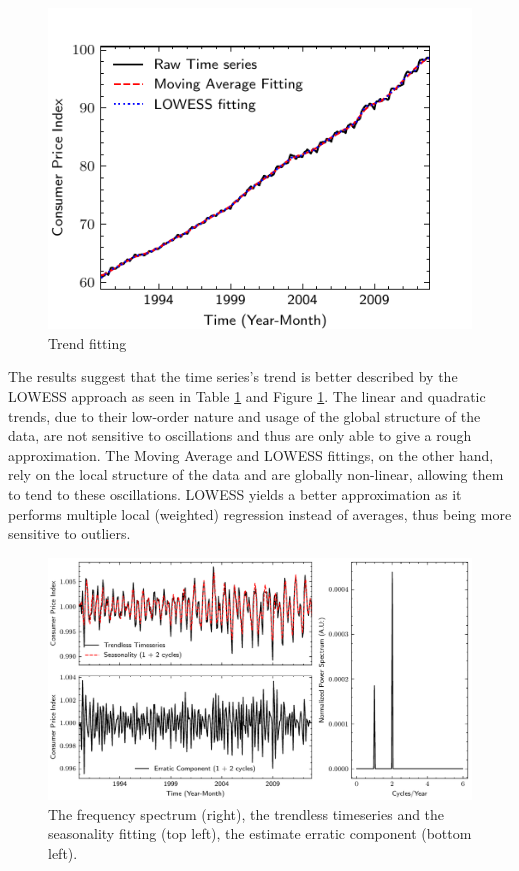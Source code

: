 \documentclass[conference]{IEEEtran}
\begin{document}
\begin{figure}[hbtp]
    \centering
    \includegraphics{../figs/trend.pdf}
    \caption{Trend fitting}
    \label{fig:trend}
\end{figure}

The results suggest that the time series's trend is better described by the LOWESS approach as seen in Table \ref{fig:trend} and Figure \ref{fig:trend}. The linear and quadratic trends, due to their low-order nature and usage of the global structure of the data, are not sensitive to oscillations and thus are only able to give a rough approximation. The Moving Average and LOWESS fittings, on the other hand, rely on the local structure of the data and are globally non-linear, allowing them to tend to these oscillations. LOWESS yields a better approximation as it performs multiple local (weighted) regression instead of averages, thus being more sensitive to outliers.

\begin{figure}[hbtp]
    \centering
    \includegraphics{../figs/season.pdf}
    \caption{The frequency spectrum (right), the trendless timeseries and the seasonality fitting (top left), the estimate erratic component (bottom left).}
    \label{fig:season}
\end{figure}
\end{document}
